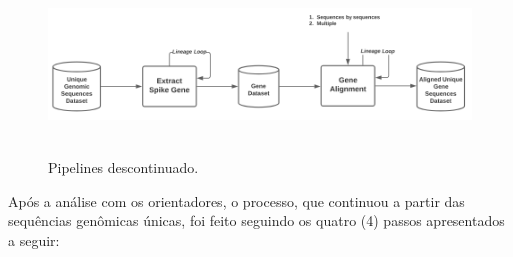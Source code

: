 \begin{figure}[htb]
  \centering
  \caption{Pipelines descontinuado.}
  \includegraphics[scale=0.45]{figuras/pipelines/pipelines_descontinuado.png}
  ~\label{fig:pipelinesDescontinuados}
\end{figure}

Após a análise com os orientadores, o processo, que continuou a partir das sequências genômicas únicas, foi feito seguindo os quatro (4) passos apresentados a seguir:


